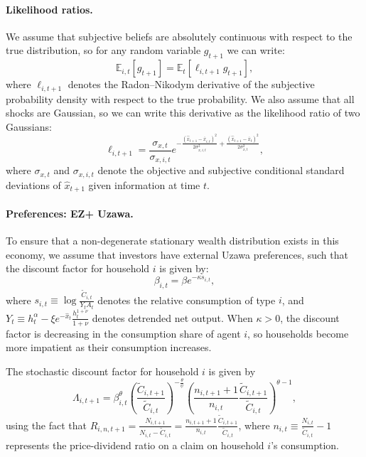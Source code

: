 \paragraph{Likelihood ratios.} We assume that subjective beliefs are absolutely continuous with respect to the true distribution, so for any random variable $g_{t+1}$ we can write:
\begin{equation}
    \mathbb{E}_{i,t}[g_{t+1}] = \mathbb{E}_{t}[\ell_{i,t+1} g_{t+1}],
\end{equation}
where $\ell_{i,t+1}$ denotes the Radon--Nikodym derivative of the subjective probability density with respect to the true probability. We also assume that all shocks are Gaussian, so we can write this derivative as the likelihood ratio of two Gaussians:
\begin{equation}
    \ell_{i,t+1} = \frac{\sigma_{x,t}}{\sigma_{x,i,t}}
    e^{-\frac{(\hat{x}_{t+1} - \overline{x}_{i,t})^2}{2\sigma_{x,i,t}^2} + \frac{(\hat{x}_{t+1} - \overline{x}_t)^2}{2\sigma_{x,t}^2}},
\end{equation}
where \(\sigma_{x,t}\) and \(\sigma_{x,i,t}\) denote the objective and subjective conditional standard deviations of \(\hat{x}_{t+1}\) given information at time \(t\).

\paragraph{Preferences: EZ+ Uzawa.} To ensure that a non-degenerate stationary wealth distribution exists in this economy, we assume that investors have external Uzawa preferences, such that the discount factor for household $i$ is given by:
\begin{equation}
    \beta_{i,t} = \beta e^{-\kappa s_{i,t}},
\end{equation}
where $s_{i,t} \equiv \log \frac{\tilde{C}_{i,t}}{Y_t A_t}$ denotes the relative consumption of type $i$, and $Y_t \equiv h_t^\alpha - \xi e^{-\hat{x}_t} \frac{h_t^{1+\nu}}{1+\nu}$ denotes detrended net output.
When $\kappa > 0$, the discount factor is decreasing in the consumption share of agent $i$, so households become more impatient as their consumption increases. 

The stochastic discount factor for household $i$ is given by
\begin{equation}
    \Lambda_{i,t+1} = \beta_{i,t}^\theta \left( \frac{\tilde{C}_{i,t+1}}{\tilde{C}_{i,t}} \right)^{-\frac{\theta}{\psi}} \left( \frac{n_{i,t+1} + 1}{n_{i,t}} \frac{\tilde{C}_{i,t+1}}{\tilde{C}_{i,t}} \right)^{\theta-1},
\end{equation}
using the fact that $R_{i,n,t+1} = \frac{N_{i,t+1}}{N_{i,t} - \tilde{C}_{i,t}} = \frac{n_{i,t+1}+1}{n_{i,t}} \frac{\tilde{C}_{i,t+1}}{\tilde{C}_{i,t}}$, where $n_{i,t} \equiv \frac{N_{i,t}}{\tilde{C}_{i,t}}-1$ represents the price-dividend ratio on a claim on household $i$'s consumption.

